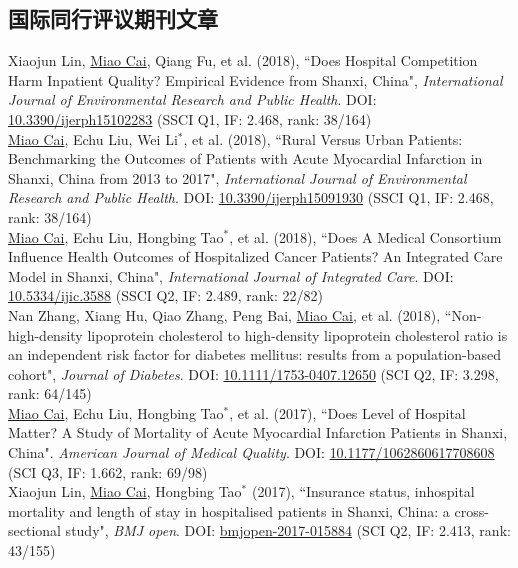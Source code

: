 \documentclass[11pt, a4paper]{article}
\newcommand{\years}[1]{\marginnote{\scriptsize #1}}
\begin{document}
\subsection*{国际同行评议期刊文章}
\noindent
\years{2018}Xiaojun Lin, \underline{Miao Cai}, Qiang Fu, et al. (2018), ``Does Hospital Competition Harm Inpatient Quality? Empirical Evidence from Shanxi, China", \emph{International Journal of Environmental Research and Public Health}. DOI: \href{https://doi.org/10.3390/ijerph15102283}{10.3390/ijerph15102283} (SSCI Q1, IF: 2.468, rank: 38/164)\\
\years{2018}\underline{Miao Cai}, Echu Liu, Wei Li$^\ast$, et al. (2018), ``Rural Versus Urban Patients: Benchmarking the Outcomes of Patients with Acute Myocardial Infarction in Shanxi, China from 2013 to 2017", \emph{International Journal of Environmental Research and Public Health}. DOI: \href{https://doi.org/10.3390/ijerph15091930}{10.3390/ijerph15091930} (SSCI Q1, IF: 2.468, rank: 38/164)\\
\years{2018}\underline{Miao Cai}, Echu Liu, Hongbing Tao$^\ast$, et al. (2018), ``Does A Medical Consortium Influence Health Outcomes of Hospitalized Cancer Patients? An Integrated Care Model in Shanxi, China", \emph{International Journal of Integrated Care}. DOI: \href{https://doi.org/10.5334/ijic.3588}{10.5334/ijic.3588} (SSCI Q2, IF: 2.489, rank: 22/82)\\
\years{2018}Nan Zhang, Xiang Hu, Qiao Zhang, Peng Bai, \underline{Miao Cai}, et al. (2018), ``Non-high-density lipoprotein cholesterol to high-density lipoprotein cholesterol ratio is an independent risk factor for diabetes mellitus: results from a population-based cohort", \emph{Journal of Diabetes}. DOI: \href{https://doi.org/10.1111/1753-0407.12650}{10.1111/1753-0407.12650} (SCI Q2, IF: 3.298, rank: 64/145)\\
\years{2017}\underline{Miao Cai}, Echu Liu, Hongbing Tao$^\ast$, et al. (2017), ``Does Level of Hospital Matter? A Study of Mortality of Acute Myocardial Infarction Patients in Shanxi, China". \emph{American Journal of Medical Quality}. DOI: \href{https://doi.org/10.1177/1062860617708608}{10.1177/1062860617708608} (SCI Q3, IF: 1.662, rank: 69/98)\\
\years{2017}Xiaojun Lin, \underline{Miao Cai}, Hongbing Tao$^\ast$ (2017), ``Insurance status, inhospital mortality and length of stay in hospitalised patients in Shanxi, China: a cross-sectional study", \emph{BMJ open}. DOI: \href{https://doi.org/10.1136/bmjopen-2017-015884}{bmjopen-2017-015884} (SCI Q2, IF: 2.413, rank: 43/155)\\
\end{document}
